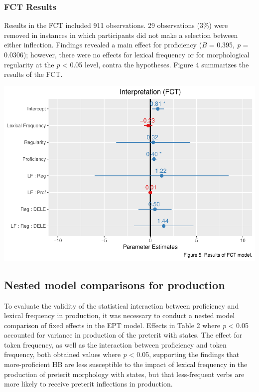 \documentclass[
  english,
  man,floatsintext]{apa6}
\begin{document}
\hypertarget{fct-results}{%
\subsubsection{FCT Results}\label{fct-results}}

Results in the FCT included 911 observations. 29 observations (3\%) were removed in instances in which participants did not make a selection between either inflection. Findings revealed a main effect for proficiency (\emph{B} = 0.395, \emph{p} = 0.0306); however, there were no effects for lexical frequency or for morphological regularity at the \emph{p} \textless{} 0.05 level, contra the hypotheses. Figure 4 summarizes the results of the FCT.

\includegraphics{Final-Manuscript_files/figure-latex/HB-FCT-model-1.pdf}

\hypertarget{nested-model-comparisons-for-production}{%
\subsection{Nested model comparisons for production}\label{nested-model-comparisons-for-production}}

To evaluate the validity of the statistical interaction between proficiency and lexical frequency in production, it was necessary to conduct a nested model comparison of fixed effects in the EPT model. Effects in Table 2 where \emph{p} \textless{} 0.05 accounted for variance in production of the preterit with states. The effect for token frequency, as well as the interaction between proficiency and token frequency, both obtained values where \emph{p} \textless{} 0.05, supporting the findings that more-proficient HB are less susceptible to the impact of lexical frequency in the production of preterit morphology with states, but that less-frequent verbs are more likely to receive preterit inflections in production.
\end{document}
